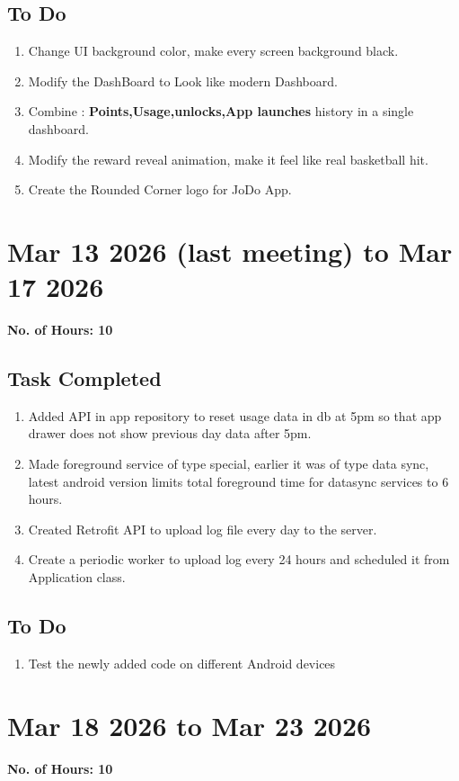 \documentclass[12pt]{article}
\begin{document}
    \subsection{To Do}
    \begin{enumerate}
        \item Change UI background color, make every screen background black.
        \item Modify the DashBoard to Look like modern Dashboard.
        \item Combine : \textbf{Points,Usage,unlocks,App launches } history in a single dashboard.
        \item Modify the reward reveal animation, make it feel like real basketball hit.
        \item Create the Rounded Corner logo for JoDo App.
    \end{enumerate}
 \section{Mar 13 2026 (last meeting) to Mar 17 2026}
{\bf No. of Hours: 10}
\subsection{Task Completed}
\begin{enumerate}
    \item Added API in app repository to reset usage data in db at 5pm so that app drawer does not show previous day data after 5pm.
    \item Made foreground service of type special, earlier it was of type data sync, latest android version limits total foreground time for datasync services to 6 hours.
    \item Created Retrofit API to upload log file every day to the server.
    \item Create a periodic worker to upload log every 24 hours and scheduled it from Application class.
\end{enumerate}
\subsection{To Do}
\begin{enumerate}
    \item Test the newly added code on different Android devices
\end{enumerate}
\section{Mar 18 2026 to Mar 23 2026}
{\bf No. of Hours: 10}
\end{document}
